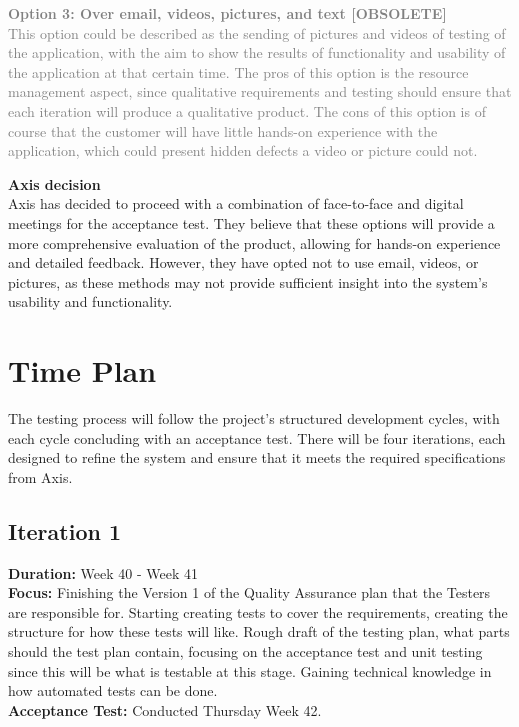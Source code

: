 \documentclass{article}
\begin{document}
\textcolor{gray}{\textbf{Option 3: Over email, videos, pictures, and text [OBSOLETE]}\\
This option could be described as the sending of pictures and videos of testing of the application, with the aim to show the results of functionality and usability of the application at that certain time. The pros of this option is the resource management aspect, since qualitative requirements and testing should ensure that each iteration will produce a qualitative product. The cons of this option is of course that the customer will have little hands-on experience with the application, which could present hidden defects a video or picture could not. }

\textbf{Axis decision} \\
Axis has decided to proceed with a combination of face-to-face and digital meetings for the acceptance test. They believe that these options will provide a more comprehensive evaluation of the product, allowing for hands-on experience and detailed feedback. However, they have opted not to use email, videos, or pictures, as these methods may not provide sufficient insight into the system’s usability and functionality.


\section{Time Plan}

The testing process will follow the project’s structured development cycles, with each cycle concluding with an acceptance test. There will be four iterations, each designed to refine the system and ensure that it meets the required specifications from Axis. 

\subsection{Iteration 1}
\textbf{Duration:} Week 40 - Week 41\\
\textbf{Focus:} Finishing the Version 1 of the Quality Assurance plan that the Testers are responsible for. Starting creating tests to cover the requirements, creating the structure for how these tests will like. Rough draft of the testing plan, what parts should the test plan contain, focusing on the acceptance test and unit testing since this will be what is testable at this stage. Gaining technical knowledge in how automated tests can be done.\\
\textbf{Acceptance Test:} Conducted Thursday Week 42.
\end{document}
